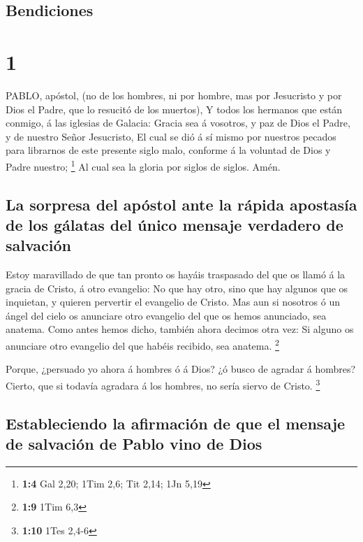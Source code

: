 \hypertarget{bendiciones}{%
\subsection{Bendiciones}\label{bendiciones}}

\hypertarget{section}{%
\section{1}\label{section}}

 PABLO, apóstol, (no de los hombres, ni por hombre, mas por
Jesucristo y por Dios el Padre, que lo resucitó de los muertos),
 Y todos los hermanos que están conmigo, á las iglesias de
Galacia:  Gracia sea á vosotros, y paz de Dios el Padre, y
de nuestro Señor Jesucristo,  El cual se dió á sí mismo por
nuestros pecados para librarnos de este presente siglo malo, conforme á
la voluntad de Dios y Padre nuestro; \footnote{\textbf{1:4} Gal 2,20;
  1Tim 2,6; Tit 2,14; 1Jn 5,19}  Al cual sea la gloria por
siglos de siglos. Amén.

\hypertarget{la-sorpresa-del-apuxf3stol-ante-la-ruxe1pida-apostasuxeda-de-los-guxe1latas-del-uxfanico-mensaje-verdadero-de-salvaciuxf3n}{%
\subsection{La sorpresa del apóstol ante la rápida apostasía de los
gálatas del único mensaje verdadero de
salvación}\label{la-sorpresa-del-apuxf3stol-ante-la-ruxe1pida-apostasuxeda-de-los-guxe1latas-del-uxfanico-mensaje-verdadero-de-salvaciuxf3n}}

 Estoy maravillado de que tan pronto os hayáis traspasado
del que os llamó á la gracia de Cristo, á otro evangelio: 
No que hay otro, sino que hay algunos que os inquietan, y quieren
pervertir el evangelio de Cristo.  Mas aun si nosotros ó un
ángel del cielo os anunciare otro evangelio del que os hemos anunciado,
sea anatema.  Como antes hemos dicho, también ahora decimos
otra vez: Si alguno os anunciare otro evangelio del que habéis recibido,
sea anatema. \footnote{\textbf{1:9} 1Tim 6,3}

 Porque, ¿persuado yo ahora á hombres ó á Dios? ¿ó busco de
agradar á hombres? Cierto, que si todavía agradara á los hombres, no
sería siervo de Cristo. \footnote{\textbf{1:10} 1Tes 2,4-6}

\hypertarget{estableciendo-la-afirmaciuxf3n-de-que-el-mensaje-de-salvaciuxf3n-de-pablo-vino-de-dios}{%
\subsection{Estableciendo la afirmación de que el mensaje de salvación
de Pablo vino de
Dios}\label{estableciendo-la-afirmaciuxf3n-de-que-el-mensaje-de-salvaciuxf3n-de-pablo-vino-de-dios}}

